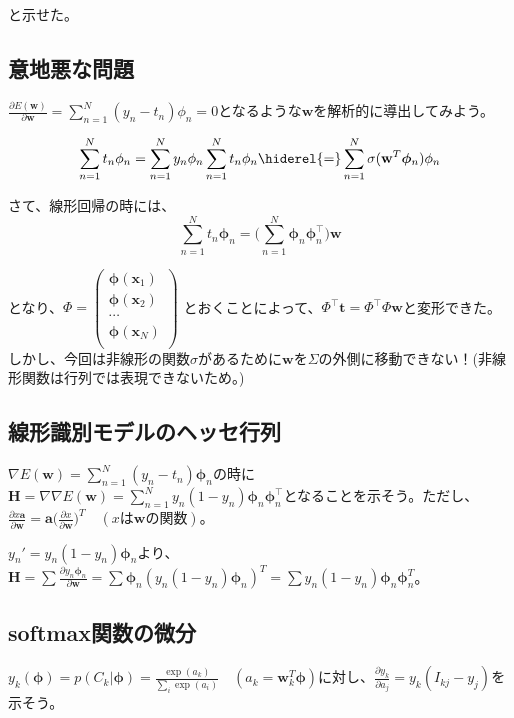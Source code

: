 と示せた。

\subsection*{意地悪な問題}
$\frac{\partial E(\mathbf{w})}{\partial \mathbf{w}} =  \sum_{n=1}^N (y_n - t_n) \phi_n = 0$となるような$\mathbf{w}$を解析的に導出してみよう。

\begin{dmath*}
\sum_{n=1}^N t_n \phi_n = \sum_{n=1}^N y_n \phi_n \\
\sum_{n=1}^N t_n \phi_n \hiderel{=} \sum_{n=1}^N  \sigma(\mathbf{w}^T \bm{\phi}_n) \phi_n
\end{dmath*}

さて、線形回帰の時には、
\begin{equation}
	\sum_{n=1}^N t_n \bm{\phi}_n = \bigg( \sum_{n=1}^N \bm{\phi}_n \bm{\phi}_n^{\top} \bigg) \mathbf{w}
\end{equation}

となり、$\Phi = \begin{pmatrix} 
\bm{\phi}(\mathbf{x}_1) \\
\bm{\phi}(\mathbf{x}_2) \\
\cdots \\
\bm{\phi}(\mathbf{x}_N) \\
\end{pmatrix}$ とおくことによって、$\Phi^{\top} \mathbf{t}   = \Phi^{\top} \Phi  \mathbf{w}$と変形できた。しかし、今回は非線形の関数$\sigma$があるために$\mathbf{w}$を$\Sigma$の外側に移動できない！(非線形関数は行列では表現できないため。)


\subsection*{線形識別モデルのヘッセ行列}

$\nabla E (\mathbf{w} ) = \sum_{n=1}^N (y_n - t_n) \bm{\phi}_n $の時に$\mathbf{H} = \nabla \nabla E(\mathbf{w}) = \sum_{n=1}^N y_n (1 - y_n) \bm{\phi}_n \bm{\phi}_n^{\top}$となることを示そう。ただし、$\frac{\partial x \mathbf{a}}{\partial \mathbf{w}} = \mathbf{a} \big( \frac{\partial x}{\partial \mathbf{w}} \big)^T \quad (x \text{は} \mathbf{w} \text{の関数})$。

$y_n' = y_n(1-y_n)\bm{\phi}_n$より、$\mathbf{H} = \sum \frac{\partial  y_n \bm{\phi}_n}{\partial \mathbf{w}} = \sum \bm{\phi}_n (y_n(1 - y_n) {\bm{\phi}_n})^T = \sum  y_n(1 - y_n) {\bm{\phi}_n} \bm{\phi}_n^T$。


\subsection*{softmax関数の微分}
$ y_k(\bm{\phi})  =  p(C_k | \bm{\phi}) = \frac{\exp(a_{k})}{\sum_i \exp(a_{i}) } \quad (a_k = \mathbf{w}_k^T \bm{\phi}) $に対し、$\frac{\partial y_k}{\partial a_j} = y_k (I_{kj} - y_j)$を示そう。

